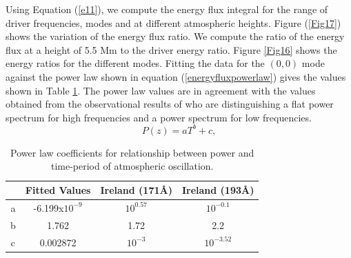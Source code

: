 \documentclass[preprint,authoryear,12pt]{elsarticle}
\begin{document}
Using Equation (\ref{e11}), we compute the energy flux integral for the range of driver frequencies, modes and at different atmospheric heights. Figure (\ref{Fig17}) shows the variation of the energy flux ratio. We compute the ratio of the energy flux at a height of 5.5 Mm to the driver energy ratio. Figure \ref{Fig16} shows the energy ratios for the different modes. Fitting  the  data for the $(0, 0)$ mode against the power law shown in equation (\ref{energyfluxpowerlaw}) gives the values shown in Table \ref{Table3}. The power law values are in agreement with the values obtained from the observational results of \citet{Ireland2015} who are distinguishing a flat power spectrum for high frequencies and a power spectrum for low frequencies.
\begin{equation}
P(z)= aT^{b}+c,
\label{energyfluxpowerlaw}
\end{equation}
\begin{table}
\centering
\begin{tabular}{cccc}
\hline
   &  Fitted Values & Ireland (171{\AA}) & Ireland (193{\AA}) \\
\hline
a & -6.199x$10^{-9}$ &  $10^{0.57}$ & $10^{-0.1}$ \\
\hline
b & 1.762 & 1.72 & 2.2 \\
\hline
c & 0.002872 & $10^{-3}$ & $10^{-3.52}$ \\
\hline
\end{tabular} 
\caption{ Power law coefficients for relationship between power and time-period of atmospheric oscillation.}
\label{Table3}
\end{table}
\end{document}

